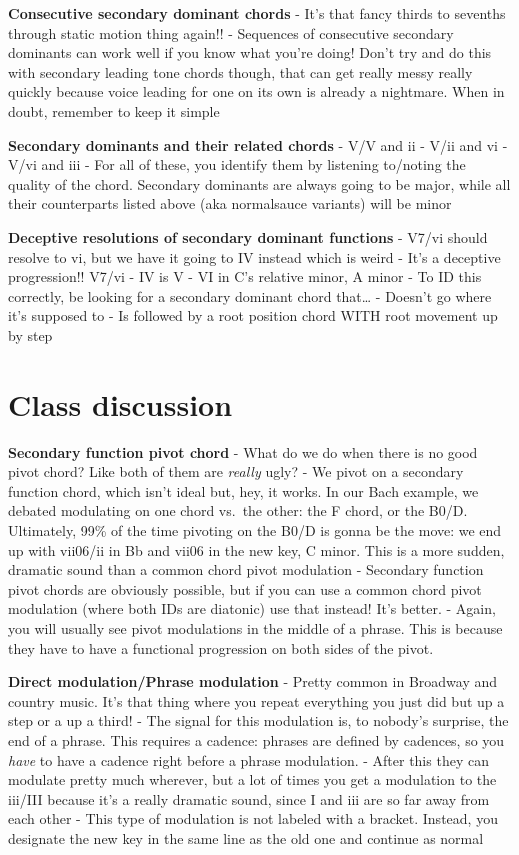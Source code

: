 \documentclass{book}
\begin{document}
\textbf{Consecutive secondary dominant chords} - It's that fancy thirds to
sevenths through static motion thing again!! - Sequences of consecutive
secondary dominants can work well if you know what you're doing! Don't try and
do this with secondary leading tone chords though, that can get really messy
really quickly because voice leading for one on its own is already a
nightmare. When in doubt, remember to keep it simple

\textbf{Secondary dominants and their related chords} - V/V and ii - V/ii and
vi - V/vi and iii - For all of these, you identify them by listening to/noting
the quality of the chord. Secondary dominants are always going to be major,
while all their counterparts listed above (aka normalsauce variants) will be
minor

\textbf{Deceptive resolutions of secondary dominant functions} - V7/vi should
resolve to vi, but we have it going to IV instead which is weird - It's a
deceptive progression!! V7/vi - IV is V - VI in C's relative minor, A minor -
To ID this correctly, be looking for a secondary dominant chord that\ldots{} -
Doesn't go where it's supposed to - Is followed by a root position chord WITH
root movement up by step

\hypertarget{class-discussion-55}{%
\chapter{Class discussion}\label{class-discussion-55}}

\textbf{Secondary function pivot chord} - What do we do when there is no good
pivot chord? Like both of them are \emph{really} ugly? - We pivot on a
secondary function chord, which isn't ideal but, hey, it works. In our Bach
example, we debated modulating on one chord vs.~the other: the F chord, or the
B0/D. Ultimately, 99\% of the time pivoting on the B0/D is gonna be the move:
we end up with vii06/ii in Bb and vii06 in the new key, C minor. This is a
more sudden, dramatic sound than a common chord pivot modulation - Secondary
function pivot chords are obviously possible, but if you can use a common
chord pivot modulation (where both IDs are diatonic) use that instead! It's
better. - Again, you will usually see pivot modulations in the middle of a
phrase. This is because they have to have a functional progression on both
sides of the pivot.

\textbf{Direct modulation/Phrase modulation} - Pretty common in Broadway and
country music. It's that thing where you repeat everything you just did but up
a step or a up a third! - The signal for this modulation is, to nobody's
surprise, the end of a phrase. This requires a cadence: phrases are defined by
cadences, so you \emph{have} to have a cadence right before a phrase
modulation. - After this they can modulate pretty much wherever, but a lot of
times you get a modulation to the iii/III because it's a really dramatic
sound, since I and iii are so far away from each other - This type of
modulation is not labeled with a bracket. Instead, you designate the new key
in the same line as the old one and continue as normal
\end{document}
